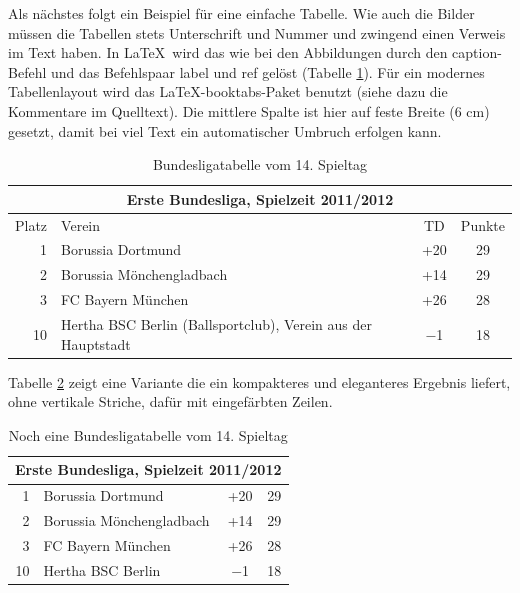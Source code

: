 Als nächstes folgt ein Beispiel für eine einfache Tabelle. Wie auch die Bilder müssen die Tabellen stets Unterschrift und Nummer und zwingend einen Verweis im Text haben. In \LaTeX\ wird das wie bei den Abbildungen durch den caption-Befehl und das Befehlspaar label und ref gelöst (Tabelle \ref{t_buli}). Für ein modernes Tabellenlayout wird das \LaTeX-booktabs-Paket benutzt (siehe dazu die Kommentare im Quelltext). Die mittlere Spalte ist hier auf feste Breite (6 cm) gesetzt, damit bei viel Text ein automatischer Umbruch erfolgen kann.

\begin{table}[htp]
\centering
\begin{tabular}{r|p{6cm}|c|c}  %
\toprule
\multicolumn{4}{c}{\large\bfseries Erste Bundesliga, Spielzeit 2011/2012}\\ \midrule
Platz & Verein & TD & Punkte\\ \midrule
1 & Borussia Dortmund & +20 & 29\\ \midrule
2 & Borussia Mönchengladbach & +14 & 29\\ \midrule
3 & FC Bayern München & +26 & 28\\ \midrule
10 & Hertha BSC Berlin (Ballsportclub), Verein aus der Hauptstadt & $-$1 & 18 \\
\bottomrule
\end{tabular}
\caption{Bundesligatabelle vom 14. Spieltag}\label{t_buli}
\end{table}

Tabelle \ref{t_buli2} zeigt eine Variante die ein kompakteres und eleganteres Ergebnis liefert, ohne vertikale Striche, dafür mit eingefärbten Zeilen.

\begin{table}[htp]
\centering
\begin{tabular}{rlcc}  %
\toprule
\multicolumn{4}{c}{\large\sffamily Erste Bundesliga, Spielzeit 2011/2012}\\ \midrule
1 & Borussia Dortmund & +20 & 29\\
2 & Borussia Mönchengladbach & +14 & 29\\
3 & FC Bayern München & +26 & 28\\
10 & Hertha BSC Berlin & $-$1 & 18 \\ \bottomrule
\end{tabular}
\caption{Noch eine Bundesligatabelle vom 14. Spieltag}\label{t_buli2}
\end{table}



